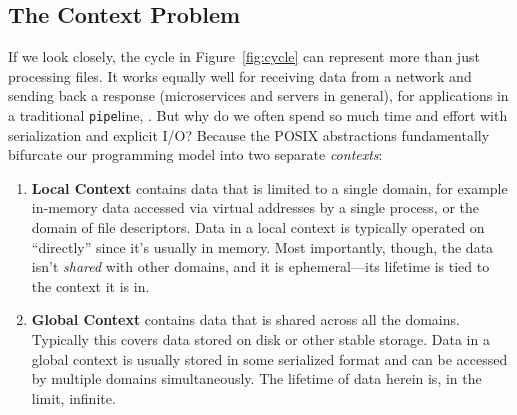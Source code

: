 \subsection{The Context Problem}

If we look closely, the cycle in Figure~\ref{fig:cycle} can represent more than just processing files. It works
equally well for receiving data from a network and sending back a response (microservices and servers in general), for
applications in a traditional \texttt{pipe}line, \etc{}. But why do we often spend so much time and effort with serialization and explicit I/O? Because the POSIX abstractions
fundamentally bifurcate our programming model into two separate \emph{contexts}:

\begin{enumerate}
    \item \textbf{Local Context} contains data that is limited to a single domain, for example in-memory data accessed
          via virtual addresses by a single process, or the domain of file descriptors. Data in a local context is typically
          operated on ``directly'' since it's usually in memory. Most importantly, though, the data isn't \emph{shared} with
          other domains, and it is ephemeral---its lifetime is tied to the context it is in.
    \item \textbf{Global Context} contains data that is shared across all the domains. Typically this covers data stored
          on disk or other stable storage. Data in a global context is usually stored in some serialized format and can
          be accessed by multiple domains simultaneously. The lifetime of data herein is, in the limit,
          infinite.
\end{enumerate}

